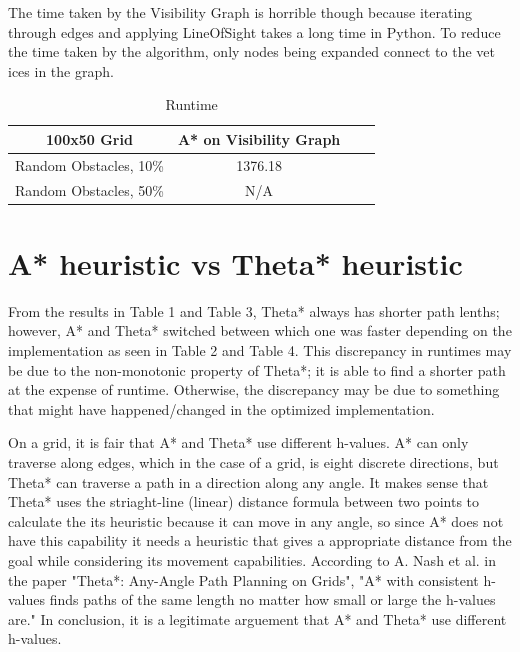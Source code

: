 \documentclass[a4paper,11pt]{report}
\begin{document}
The time taken by the Visibility Graph is horrible though because iterating through edges and applying LineOfSight takes a long time in Python. To reduce the time taken by the algorithm, only nodes being expanded connect to the vet ices in the graph.

\begin{table}[h!]
   \centering
   \begin{tabular}{ | c | c |c |c | }

      \hline
      \textbf{100x50 Grid} & \textbf{A* on Visibility Graph}  \\ \hline
      Random Obstacles, 10\% & 1376.18  \\ \hline
      Random Obstacles, 50\% &  N/A  \\ \hline

   \end{tabular}

   \caption{Runtime}
   \label{table:visibility_runtimes}
\end{table}


\section{A* heuristic vs Theta* heuristic}

From the results in Table 1 and Table 3, Theta* always has shorter path lenths; however, A* and Theta* switched between which one was faster depending on the implementation as seen in Table 2 and Table 4.  This discrepancy in runtimes may be due to the non-monotonic property of Theta*; it is able to find a shorter path at the expense of runtime.  Otherwise, the discrepancy may be due to something that might have happened/changed in the optimized implementation.

On a grid, it is fair that A* and Theta* use different h-values.  A* can only traverse along edges, which in the case of a grid, is eight discrete directions, but Theta* can traverse a path in a direction along any angle.  It makes sense that Theta* uses the striaght-line (linear) distance formula between two points to calculate the its heuristic because it can move in any angle, so since A* does not have this capability it needs a heuristic that gives a appropriate distance from the goal while considering its movement capabilities.  According to A. Nash et al. in the paper "Theta*: Any-Angle Path Planning on Grids", "A* with consistent h-values finds paths of the same length no matter how small or large the h-values are."  In conclusion, it is a legitimate arguement that A* and Theta* use different h-values.
\end{document}
